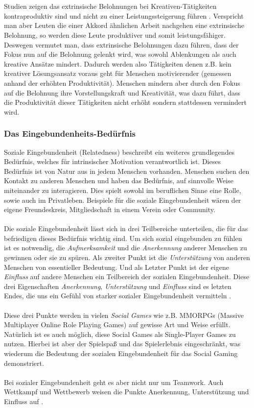 \documentclass[a4paper,12pt,twoside]{scrartcl}
\begin{document}
\\\\
Studien zeigen das extrinsische Belohnungen bei Kreativen-Tätigkeiten kontraproduktiv sind und nicht zu einer Leistungssteigerung führen \cite{Pink2010}. Verspricht man aber Leuten die einer Akkord ähnlichen Arbeit nachgehen eine extrinsische Belohnung, so werden diese Leute produktiver und somit leistungsfähiger. Deswegen vermutet man, dass extrinsische Belohnungen dazu führen, dass der Fokus nun auf die Belohnung gelenkt wird, was sowohl Ablenkungen als auch kreative Ansätze mindert. Dadurch werden also Tätigkeiten denen z.B. kein kreativer Lösungsansatz voraus geht für Menschen motivierender (gemessen anhand der erhöhten Produktivität). Menschen mindern aber durch den Fokus auf die Belohnung ihre Vorstellungskraft und Kreativität, was dazu führt, dass die Produktivität dieser Tätigkeiten nicht erhöht sondern stattdessen vermindert wird.

\subsubsection{Das Eingebundenheits-Bedürfnis}
Soziale Eingebundenheit (Relatedness) beschreibt ein weiteres grundlegendes Bedürfnis, welches für intrinsischer Motivation verantwortlich ist. Dieses Bedürfnis ist von Natur aus in jedem Menschen vorhanden. Menschen suchen den Kontakt zu anderen Menschen und haben das Bedürfnis, auf sinnvolle Weise miteinander zu interagieren. Dies spielt sowohl im beruflichen Sinne eine Rolle, sowie auch im Privatleben. Beispiele für die soziale Eingebundenheit wären der eigene Freundeskreis, Mitgliedschaft in einem Verein oder Community. 
\\\\
Die soziale Eingebundenheit lässt sich in drei Teilbereiche unterteilen, die für das befriedigen dieses Bedürfnis wichtig sind. Um sich sozial eingebunden zu fühlen ist es notwendig, die \textit{Aufmerksamkeit} und die \textit{Anerkennung} anderer Menschen zu gewinnen oder sie zu spüren. Als zweiter Punkt ist die \textit{Unterstützung} von anderen Menschen von essentieller Bedeutung. Und als Letzter Punkt ist der eigene \textit{Einfluss} auf andere Menschen ein Teilbereich der sozialen Eingebundenheit. Diese drei Eigenschaften \textit{Anerkennung}, \textit{Unterstützung} und \textit{Einfluss} sind es letzten Endes, die uns ein Gefühl von starker sozialer Eingebundenheit vermitteln \cite{Rigby2011}.
\\\\
Diese drei Punkte werden in vielen \textit{Social Games} wie z.B. MMORPGs (Massive Multiplayer Online Role Playing Games) auf gewisse Art und Weise erfüllt. Natürlich ist es auch möglich, diese Social Games als Single-Player Games zu nutzen. Hierbei ist aber der Spielspaß und das Spielerlebnis eingeschränkt, was wiederum die Bedeutung der sozialen Eingebundenheit für das Social Gaming demonstriert.
\\\\
Bei sozialer Eingebundenheit geht es aber nicht nur um Teamwork. Auch Wettkampf und Wettbewerb weisen die Punkte Anerkennung, Unterstützung und Einfluss auf \cite{Rigby2011}.
\end{document}
